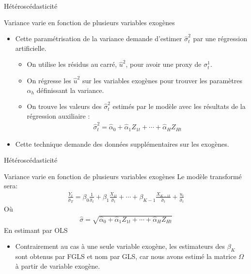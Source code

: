 \documentclass{beamer}
\begin{document}
\begin{frame}{Hétéroscédasticité}
\begin{block}{Variance varie en fonction de plusieurs variables exogènes}
\begin{itemize}
\item Cette paramétrisation de la variance demande d’estimer $\hat{\sigma}_t^2$ par une régression artificielle. 
\begin{itemize}
\item On utilise les résidus au carré, $\hat{u}^2$, pour avoir une proxy de $\sigma_t^1$.
\item On régresse les $\hat{u}^2$ sur les variables exogènes pour trouver les
paramètres $\alpha_h$ définissant la variance.
\item On trouve les valeurs des $\hat{\sigma}_t^2$ estimés par le modèle avec les résultats de
la régression auxiliaire :
\begin{align*}
\hat{\sigma}_t^2=\hat{\alpha}_0+\hat{\alpha}_1 Z_{1t}+\cdots+\hat{\alpha}_HZ_{Ht}
\end{align*}
\end{itemize}
\item Cette technique demande des données supplémentaires sur les exogènes.
\end{itemize}
\end{block}
\end{frame}


\begin{frame}{Hétéroscédasticité}
\begin{block}{Variance varie en fonction de plusieurs variables exogènes}
Le modèle transformé sera:
\begin{align*}
\frac{Y_t}{\hat{\sigma}_T}=\beta_0 \frac{1}{\hat{\sigma}_t}+\beta_1 \frac{X_{1t}}{\hat{\sigma}_t}+\cdots+\beta_{K-1} \frac{X_{K-1t}}{\hat{\sigma}_t}+\frac{u_t}{\hat{\sigma}_t}
\end{align*}
Où 
\begin{align*}
\hat{\sigma}=\sqrt{\hat{\alpha}_0+\hat{\alpha}_1 Z_{1t}+\cdots+\hat{\alpha}_H Z_{Ht}}
\end{align*}
En estimant par OLS
\begin{itemize}
\item Contrairement au cas à une seule variable exogène, les estimateurs des $\beta_K$ sont obtenus par FGLS et nom par GLS, car nous avons estimé la matrice $\Omega$ à partir de variable exogène.
\end{itemize}
\end{block}
\end{frame}
\end{document}
